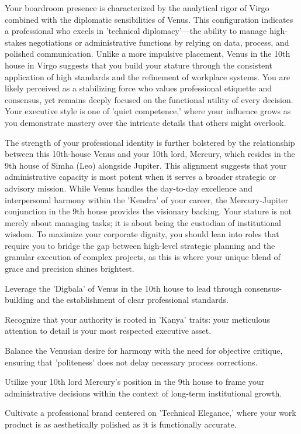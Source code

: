 {\fontsize{9}{13}\selectfont Your boardroom presence is characterized by the analytical rigor of Virgo combined with the diplomatic sensibilities of Venus. This configuration indicates a professional who excels in 'technical diplomacy'---the ability to manage high-stakes negotiations or administrative functions by relying on data, process, and polished communication. Unlike a more impulsive placement, Venus in the 10th house in Virgo suggests that you build your stature through the consistent application of high standards and the refinement of workplace systems. You are likely perceived as a stabilizing force who values professional etiquette and consensus, yet remains deeply focused on the functional utility of every decision. Your executive style is one of 'quiet competence,' where your influence grows as you demonstrate mastery over the intricate details that others might overlook.}\par\vspace{1.8mm}

{\fontsize{9}{13}\selectfont The strength of your professional identity is further bolstered by the relationship between this 10th-house Venus and your 10th lord, Mercury, which resides in the 9th house of Simha (Leo) alongside Jupiter. This alignment suggests that your administrative capacity is most potent when it serves a broader strategic or advisory mission. While Venus handles the day-to-day excellence and interpersonal harmony within the 'Kendra' of your career, the Mercury-Jupiter conjunction in the 9th house provides the visionary backing. Your stature is not merely about managing tasks; it is about being the custodian of institutional wisdom. To maximize your corporate dignity, you should lean into roles that require you to bridge the gap between high-level strategic planning and the granular execution of complex projects, as this is where your unique blend of grace and precision shines brightest.}\par\vspace{1.8mm}

\begin{diamondlist}
  \item {\fontsize{8.5}{12}\selectfont Leverage the 'Digbala' of Venus in the 10th house to lead through consensus-building and the establishment of clear professional standards.}
  \item {\fontsize{8.5}{12}\selectfont Recognize that your authority is rooted in 'Kanya' traits: your meticulous attention to detail is your most respected executive asset.}
  \item {\fontsize{8.5}{12}\selectfont Balance the Venusian desire for harmony with the need for objective critique, ensuring that 'politeness' does not delay necessary process corrections.}
  \item {\fontsize{8.5}{12}\selectfont Utilize your 10th lord Mercury's position in the 9th house to frame your administrative decisions within the context of long-term institutional growth.}
  \item {\fontsize{8.5}{12}\selectfont Cultivate a professional brand centered on 'Technical Elegance,' where your work product is as aesthetically polished as it is functionally accurate.}
\end{diamondlist}

